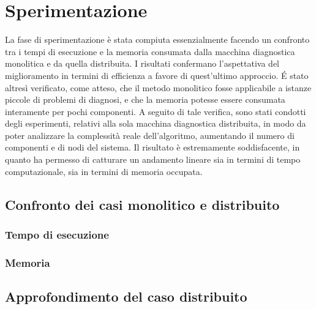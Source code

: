 \chapter{Sperimentazione}
La fase di sperimentazione è stata compiuta essenzialmente facendo un confronto tra i tempi di esecuzione e la memoria consumata dalla macchina diagnostica monolitica e da quella distribuita. I risultati confermano l'aspettativa del miglioramento in termini di efficienza a favore di quest'ultimo approccio. \'E stato altresì verificato, come atteso, che il metodo monolitico fosse applicabile a istanze piccole di problemi di diagnosi, e che la memoria potesse essere consumata interamente per pochi componenti. A seguito di tale verifica, sono stati condotti degli esperimenti, relativi alla sola macchina diagnostica distribuita, in modo da poter analizzare la complessità reale dell'algoritmo, aumentando il numero di componenti e di nodi del sistema. Il risultato è estremamente soddisfacente, in quanto ha permesso di catturare un andamento lineare sia in termini di tempo computazionale, sia in termini di memoria occupata.


\section{Confronto dei casi monolitico e distribuito}
\subsection{Tempo di esecuzione}

\subsection{Memoria}

\section{Approfondimento del caso distribuito}
